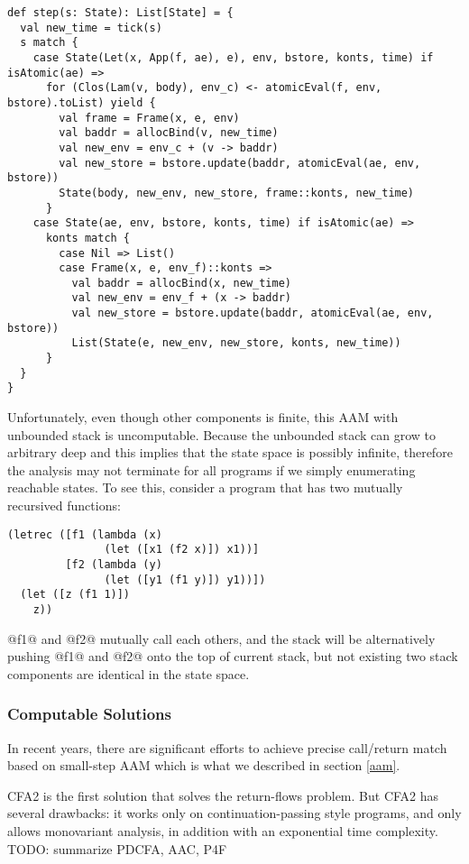 \documentclass[acmsmall,review,anonymous]{acmart}\settopmatter{printfolios=true,printccs=false,printacmref=false}
\begin{document}
\begin{lstlisting}
def step(s: State): List[State] = {
  val new_time = tick(s)
  s match {
    case State(Let(x, App(f, ae), e), env, bstore, konts, time) if isAtomic(ae) =>
      for (Clos(Lam(v, body), env_c) <- atomicEval(f, env, bstore).toList) yield {
        val frame = Frame(x, e, env)
        val baddr = allocBind(v, new_time)
        val new_env = env_c + (v -> baddr)
        val new_store = bstore.update(baddr, atomicEval(ae, env, bstore))
        State(body, new_env, new_store, frame::konts, new_time)
      }
    case State(ae, env, bstore, konts, time) if isAtomic(ae) =>
      konts match {
        case Nil => List()
        case Frame(x, e, env_f)::konts =>
          val baddr = allocBind(x, new_time)
          val new_env = env_f + (x -> baddr)
          val new_store = bstore.update(baddr, atomicEval(ae, env, bstore))
          List(State(e, new_env, new_store, konts, new_time))
      }
  }
}
\end{lstlisting}

Unfortunately, even though other components is finite, this AAM with unbounded stack is uncomputable. 
Because the unbounded stack can grow to arbitrary deep and this implies that the state space is possibly 
infinite, therefore the analysis may not terminate for all programs if we simply enumerating 
reachable states.
To see this, consider a program that has two mutually recursived functions:

\begin{lstlisting}
(letrec ([f1 (lambda (x) 
               (let ([x1 (f2 x)]) x1))]
         [f2 (lambda (y)
               (let ([y1 (f1 y)]) y1))])
  (let ([z (f1 1)])
    z))
\end{lstlisting}

@f1@ and @f2@ mutually call each others, and the stack will be alternatively
pushing @f1@ and @f2@ onto the top of current stack, but not existing 
two stack components are identical in the state space.

\subsubsection{Computable Solutions}

In recent years, there are significant efforts \cite{vardoulakis2010cfa2, earl2012introspective, 
gilray2016pushdown, johnson2015abstracting} to achieve precise call/return 
match based on small-step AAM which is what we described in section \ref{aam}.

CFA2 is the first solution that solves the return-flows problem\cite{vardoulakis2010cfa2}.
But CFA2 has several drawbacks: it works only on continuation-passing style programs, 
and only allows monovariant analysis, in addition with an exponential time complexity.
TODO: summarize PDCFA, AAC, P4F
\end{document}

